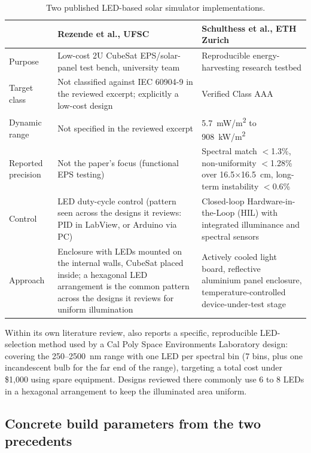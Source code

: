 \begin{table}[!ht]
\centering
\small
\caption{Two published LED-based solar simulator implementations.}
\label{tab:precedents}
\begin{tabularx}{\textwidth}{p{} X X}
\toprule
\textbf{} & \textbf{Rezende et al., UFSC \cite{rezende2024lowcost}} & \textbf{Schulthess et al., ETH Zurich \cite{schulthess2026classaaa}} \\
\midrule
Purpose & Low-cost 2U CubeSat EPS/solar-panel test bench, university team & Reproducible energy-harvesting research testbed \\
Target class & Not classified against IEC 60904-9 in the reviewed excerpt; explicitly a low-cost design & Verified Class AAA \\
Dynamic range & Not specified in the reviewed excerpt & 5.7~mW/m\textsuperscript{2} to 908~kW/m\textsuperscript{2} \\
Reported precision & Not the paper's focus (functional EPS testing) & Spectral match $<$1.3\%, non-uniformity $<$1.28\% over 16.5$\times$16.5~cm, long-term instability $<$0.6\% \\
Control & LED duty-cycle control (pattern seen across the designs it reviews: PID in LabView, or Arduino via PC) & Closed-loop Hardware-in-the-Loop (HIL) with integrated illuminance and spectral sensors \\
Approach & Enclosure with LEDs mounted on the internal walls, CubeSat placed inside; a hexagonal LED arrangement is the common pattern across the designs it reviews for uniform illumination & Actively cooled light board, reflective aluminium panel enclosure, temperature-controlled device-under-test stage \\
\bottomrule
\end{tabularx}
\end{table}

Within its own literature review, \cite{rezende2024lowcost} also reports a specific, reproducible LED-selection method used by a Cal Poly Space Environments Laboratory design: covering the 250--2500~nm range with one LED per spectral bin (7 bins, plus one incandescent bulb for the far end of the range), targeting a total cost under \$1{,}000 using spare equipment. Designs reviewed there commonly use 6 to 8 LEDs in a hexagonal arrangement to keep the illuminated area uniform.

\subsection{Concrete build parameters from the two precedents}
\label{sec:concrete-build-parameters}

